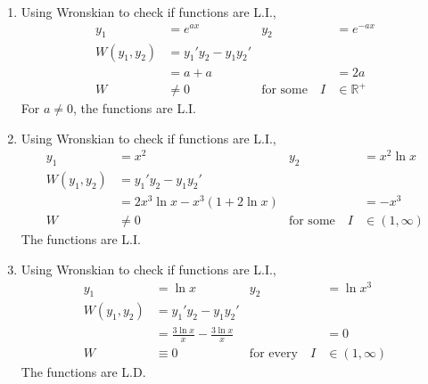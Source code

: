 \begin{enumerate}
    \item Using Wronskian to check if functions are L.I.,
          \begin{align}
              y_{1}                   & = e^{ax}                    &
              y_{2}                   & = e^{-ax}                     \\
              W(y_{1}, y_{2})         & = y_{1}'y_{2} - y_{1}y_{2}'   \\
                                      & = a + a                     &
                                      & = 2a                          \\
              W                       & \neq 0                      &
              \text{for some} \quad I & \in \mathbb{R}^{+}
          \end{align}
          For $ a \neq 0 $, the functions are L.I.

    \item Using Wronskian to check if functions are L.I.,
          \begin{align}
              y_{1}                   & = x^{2}                           &
              y_{2}                   & = x^{2}\ln x                        \\
              W(y_{1}, y_{2})         & = y_{1}'y_{2} - y_{1}y_{2}'         \\
                                      & = 2x^{3}\ln x - x^{3}(1 + 2\ln x) &
                                      & = -x^{3}                            \\
              W                       & \neq 0                            &
              \text{for some} \quad I & \in (1, \infty)
          \end{align}
          The functions are L.I.

    \item Using Wronskian to check if functions are L.I.,
          \begin{align}
              y_{1}                    & = \ln x                               &
              y_{2}                    & = \ln x^{3}                             \\
              W(y_{1}, y_{2})          & = y_{1}'y_{2} - y_{1}y_{2}'             \\
                                       & = \frac{3\ln x}{x} - \frac{3\ln x}{x} &
                                       & = 0                                     \\
              W                        & \equiv 0                              &
              \text{for every} \quad I & \in (1, \infty)
          \end{align}
          The functions are L.D.


\end{enumerate}
